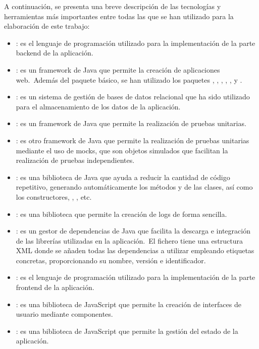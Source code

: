 A continuación, se presenta una breve descripción de las tecnologías y herramientas más importantes entre todas las que
se han utilizado para la elaboración de este trabajo:

\begin{itemize}
	\item {}: es el lenguaje de programación utilizado para la implementación de la parte backend de la
	aplicación.
	\item {}: es un framework de Java que permite la creación de aplicaciones web.\ Además del
	paquete básico, se han utilizado los paquetes , ,
	, , , y .
	\item {}: es un sistema de gestión de bases de datos relacional que ha sido utilizado para el
	almacenamiento de los datos de la aplicación.
	\item {}: es un framework de Java que permite la realización de pruebas unitarias.
	\item {}: es otro framework de Java que permite la realización de pruebas unitarias mediante el uso
	de mocks, que son objetos simulados que facilitan la realización de pruebas independientes.
	\item {}: es una biblioteca de Java que ayuda a reducir la cantidad de código repetitivo,
	generando automáticamente los métodos  y  de las clases, así como los
	constructores, , , etc.
	\item {}: es una biblioteca que permite la creación de logs de forma sencilla.
	\item {}: es un gestor de dependencias de Java que facilita la descarga e integración de las
	librerías utilizadas en la aplicación.\ El fichero  tiene una estructura XML donde se añaden
	todas las dependencias a utilizar empleando etiquetas concretas, proporcionando su nombre, versión e identificador.
	\item {}: es el lenguaje de programación utilizado para la implementación de la parte frontend
	de la aplicación.
	\item {}: es una biblioteca de JavaScript que permite la creación de interfaces de usuario mediante
	componentes.
	\item {}: es una biblioteca de JavaScript que permite la gestión del estado de la aplicación.

\end{itemize}
